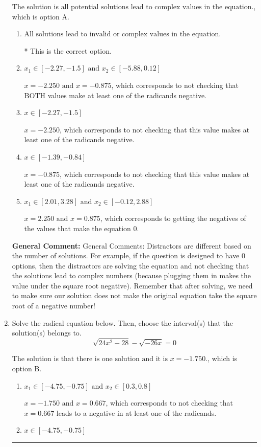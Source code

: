 \documentclass{extbook}[14pt]
\newcommand{\litem}[1]{\item #1

\rule{\textwidth}{0.4pt}}
\begin{document}
\begin{enumerate}
{The solution is \( \text{all potential solutions lead to complex values in the equation.} \), which is option A.\begin{enumerate}[label=\Alph*.]
\item \( \text{All solutions lead to invalid or complex values in the equation.} \)

* This is the correct option.
\item \( x_1 \in [-2.27, -1.5] \text{ and } x_2 \in [-5.88,0.12] \)

$x = -2.250 \text{ and } x = -0.875$, which corresponds to not checking that BOTH values make at least one of the radicands negative.
\item \( x \in [-2.27,-1.5] \)

$x = -2.250$, which corresponds to not checking that this value makes at least one of the radicands negative.
\item \( x \in [-1.39,-0.84] \)

$x = -0.875$, which corresponds to not checking that this value makes at least one of the radicands negative.
\item \( x_1 \in [2.01, 3.28] \text{ and } x_2 \in [-0.12,2.88] \)

$x = 2.250 \text{ and } x = 0.875$, which corresponds to getting the negatives of the values that make the equation 0.
\end{enumerate}

\textbf{General Comment:} General Comments: Distractors are different based on the number of solutions. For example, if the question is designed to have 0 options, then the distractors are solving the equation and not checking that the solutions lead to complex numbers (because plugging them in makes the value under the square root negative). Remember that after solving, we need to make sure our solution does not make the original equation take the square root of a negative number!
}
\litem{
Solve the radical equation below. Then, choose the interval(s) that the solution(s) belongs to.
\[ \sqrt{24 x^2 - 28} - \sqrt{-26 x} = 0 \]

The solution is \( \text{that there is one solution and it is } x = -1.750. \), which is option B.\begin{enumerate}[label=\Alph*.]
\item \( x_1 \in [-4.75, -0.75] \text{ and } x_2 \in [0.3,0.8] \)

$x = -1.750 \text{ and } x = 0.667$, which corresponds to not checking that $x = 0.667$ leads to a negative in at least one of the radicands.
\item \( x \in [-4.75,-0.75] \)


\end{enumerate}}
\end{enumerate}
\end{document}
